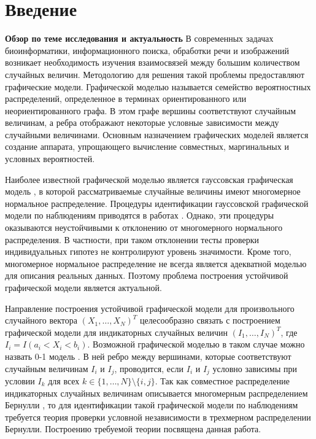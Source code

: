 \section*{Введение}

\textbf{Обзор по теме исследования и актуальность} \quad
В современных задачах биоинформатики, информационного поиска,
обработки речи и изображений возникает необходимость изучения
взаимосвязей между большим количеством случайных величин.
Методологию для решения такой проблемы предоставляют графические модели. 
Графической моделью \cite{Jordan2004} называется 
семейство вероятностных распределений, определенное в терминах
ориентированного или неориентированного графа. В этом графе вершины 
соответствуют случайным величинам, 
а ребра отображают некоторые условные зависимости между случайными величинами. 
Основным назначением графических моделей является создание
аппарата, упрощающего вычисление
совместных, маргинальных и условных вероятностей.

Наиболее известной графической моделью является 
гауссовская графическая модель \cite{Anderson2003}, в которой рассматриваемые
случайные величины имеют многомерное нормальное распределение. Процедуры
идентификации гауссовской графической модели по наблюдениям
приводятся в работах \cite{Drton2004, Drton2007}. Однако, 
эти процедуры оказываются неустойчивыми к отклонению от многомерного
нормального распределения.
В частности, при таком отклонении тесты проверки индивидуальных гипотез 
не контролируют уровень значимости. 
Кроме того, многомерное нормальное распределение не всегда является
адекватной моделью для описания реальных данных. Поэтому проблема
построения устойчивой графической модели является актуальной. 

Направление построения устойчивой графической модели
для произвольного случайного вектора $(X_1,\ldots,X_N)^T$
целесообразно связать с построением графической модели для
индикаторных случайных величин $(I_1,\ldots,I_N)^T$, где 
$I_i=I(a_i<X_i<b_i)$. 
Возможной графической моделью в таком случае можно назвать
0-1 модель \cite{low_order1}.
В ней ребро между вершинами, которые соответствуют
случайным величинам $I_i$ и $I_j$,
проводится, если $I_i$ и $I_j$ условно зависимы при условии $I_k$
для всех $k\in \{1,\ldots,N\} \setminus \{i,j\}$.
Так как совместное распределение индикаторных случайных величинам
описывается многомерным распределением Бернулли 
\cite{Dai2013, Teugels1990}, то
для идентификации такой 
графической модели
по наблюдениям требуется
теория проверки условной независимости в трехмерном распределении
Бернулли. Построению требуемой теории посвящена
данная работа.


